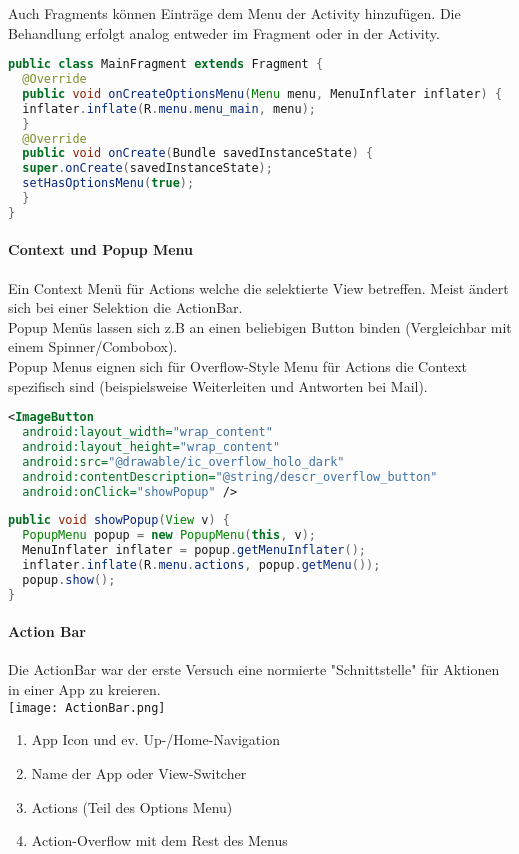 Auch Fragments können Einträge dem Menu der Activity hinzufügen. Die Behandlung erfolgt analog entweder im Fragment oder in der Activity.
\begin{lstlisting}[language=java]
public class MainFragment extends Fragment {
  @Override
  public void onCreateOptionsMenu(Menu menu, MenuInflater inflater) {
  inflater.inflate(R.menu.menu_main, menu);
  }
  @Override
  public void onCreate(Bundle savedInstanceState) {
  super.onCreate(savedInstanceState);
  setHasOptionsMenu(true);
  }
}
\end{lstlisting}
\paragraph{Context und Popup Menu} Ein Context Menü für Actions welche die selektierte View betreffen. Meist ändert sich bei einer Selektion die ActionBar.\\
Popup Menüs lassen sich z.B an einen beliebigen Button binden (Vergleichbar mit einem Spinner/Combobox). \\
Popup Menus eignen sich für Overflow-Style Menu für Actions die Context spezifisch sind (beispielsweise Weiterleiten und Antworten bei Mail). 
\begin{lstlisting}[language=xml]
<ImageButton
  android:layout_width="wrap_content" 
  android:layout_height="wrap_content" 
  android:src="@drawable/ic_overflow_holo_dark"
  android:contentDescription="@string/descr_overflow_button"
  android:onClick="showPopup" />
\end{lstlisting}
\begin{lstlisting}[language=java]
public void showPopup(View v) {
  PopupMenu popup = new PopupMenu(this, v);
  MenuInflater inflater = popup.getMenuInflater();
  inflater.inflate(R.menu.actions, popup.getMenu());
  popup.show();
}
\end{lstlisting}
\paragraph{Action Bar} Die ActionBar war der erste Versuch eine normierte "{}Schnittstelle"{} für Aktionen in einer App zu kreieren. \\
\texttt{[image: ActionBar.png]}
\begin{enumerate}
\item App Icon und ev. Up-/Home-Navigation
\item Name der App oder View-Switcher
\item Actions (Teil des Options Menu)
\item Action-Overflow mit dem Rest des Menus
\end{enumerate}
